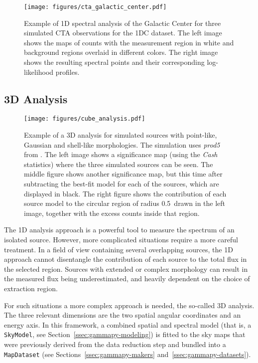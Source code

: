 \documentclass[traditabstract, longauth]{aa}
\newcommand{\code}[1]{\texttt{#1}}
\begin{document}
\begin{figure*}
	\centering
	\texttt{[image: figures/cta\_galactic\_center.pdf]}
	\caption{
		Example of 1D spectral analysis of the Galactic Center for three simulated CTA
		observations for the 1DC dataset. The left image shows the maps of counts with the measurement
		region in white and background regions overlaid in different colors. The right image
		shows the resulting spectral points and their corresponding log-likelihood
		profiles.}
	\label{fig:cta_galactic_center}
\end{figure*}


\subsection{3D Analysis}
\label{ssec:3d-analysis}
%
\begin{figure*}[t]
	\centering
	\texttt{[image: figures/cube\_analysis.pdf]}
	\caption{Example of a 3D analysis for simulated sources with point-like, Gaussian
		and shell-like morphologies. The simulation uses \textit{prod5} \irfs from \cta.
		The left image shows a significance map (using the \emph{Cash} statistics)
		where the three simulated sources can be seen. The middle figure shows another significance map,
		but this time after
		subtracting the best-fit model for each of the sources, which are displayed in
		black. The right figure shows the contribution of each source model to the
		circular region of radius 0.5\textdegree~drawn in the left image, together with
		the excess counts inside that region. }
	\label{fig:cube_analysis}
\end{figure*}
%
The 1D analysis approach is a powerful tool to measure the spectrum of an
isolated source. However, more complicated situations require a more careful
treatment. In a field of view containing several overlapping sources, the 1D
approach cannot disentangle the contribution of each source to the total flux in
the selected region. Sources with extended or complex morphology can result in
the measured flux being underestimated, and heavily dependent on the choice of
extraction region.

For such situations a more complex approach is needed, the so-called 3D
analysis. The three relevant dimensions are the two spatial angular coordinates
and an energy axis. In this framework, a combined spatial and spectral model
(that is, a \code{SkyModel}, see Section~\ref{ssec:gammapy-modeling}) is fitted to the
sky maps that were previously derived from the data reduction step and bundled into a
\code{MapDataset} (see Sections~\ref{ssec:gammapy-makers} and~\ref{ssec:gammapy-datasets}).
\end{document}

